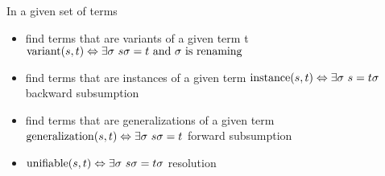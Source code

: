 
\begin{definition}
In a given set of terms
\begin{itemize}

\item find terms that are variants of a given term t
$\operatorname{variant}(s,t)\Leftrightarrow \exists\sigma\ s\sigma = t\text{ and }\sigma\text{ is renaming}$

\item find terms that are  instances of a given term  
$\operatorname{instance}(s,t)\Leftrightarrow\exists\sigma\ s = t\sigma$
\hfill{\footnotesize backward subsumption}

\item find terms that are  generalizations of a given term
$\operatorname{generalization}(s,t)\Leftrightarrow\exists\sigma\ s\sigma = t$
\hfill{\footnotesize forward subsumption}

\item {} 
$\operatorname{unifiable}(s,t)\Leftrightarrow\exists\sigma\ s\sigma = t\sigma$
\hfill{\footnotesize resolution}

\end{itemize}
\end{definition}